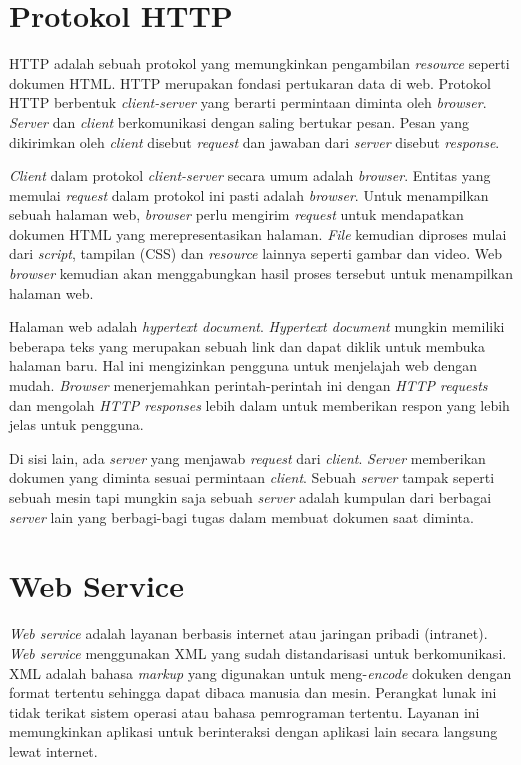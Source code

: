 \section{Protokol HTTP}
\label{sec:httpprotocol}

HTTP adalah sebuah protokol yang memungkinkan pengambilan \textit{resource} seperti dokumen HTML. HTTP merupakan fondasi pertukaran data di web. Protokol HTTP berbentuk \textit{client-server} yang berarti permintaan diminta oleh \textit{browser}. \textit{Server} dan \textit{client} berkomunikasi dengan saling bertukar pesan. Pesan yang dikirimkan oleh \textit{client} disebut \textit{request} dan jawaban dari \textit{server} disebut \textit{response}.

\textit{Client} dalam protokol \textit{client-server} secara umum adalah \textit{browser}. Entitas yang memulai \textit{request} dalam protokol ini pasti adalah \textit{browser}. Untuk menampilkan sebuah halaman web, \textit{browser} perlu mengirim \textit{request} untuk mendapatkan dokumen HTML yang merepresentasikan halaman. \textit{File} kemudian diproses mulai dari \textit{script}, tampilan (CSS) dan \textit{resource} lainnya seperti gambar dan video. Web \textit{browser} kemudian akan menggabungkan hasil proses tersebut untuk menampilkan halaman web.

Halaman web adalah \textit{hypertext document}. \textit{Hypertext document} mungkin memiliki beberapa teks yang merupakan sebuah link dan dapat diklik untuk membuka halaman baru. Hal ini mengizinkan pengguna untuk menjelajah web dengan mudah. \textit{Browser} menerjemahkan perintah-perintah ini dengan \textit{HTTP requests} dan mengolah \textit{HTTP responses} lebih dalam untuk memberikan respon yang lebih jelas untuk pengguna.

Di sisi lain, ada \textit{server} yang menjawab \textit{request} dari \textit{client}. \textit{Server} memberikan dokumen yang diminta sesuai permintaan \textit{client}. Sebuah \textit{server} tampak seperti sebuah mesin tapi mungkin saja sebuah \textit{server} adalah kumpulan dari berbagai \textit{server} lain yang berbagi-bagi tugas dalam membuat dokumen saat diminta. ~\cite{mozilla:19:http}

\section{Web Service}
\label{sec:webservice}

\textit{Web service} adalah layanan berbasis internet atau jaringan pribadi (intranet). \textit{Web service} menggunakan XML yang sudah distandarisasi untuk berkomunikasi. XML adalah bahasa \textit{markup} yang digunakan untuk meng-\textit{encode} dokuken dengan format tertentu sehingga dapat dibaca manusia dan mesin. Perangkat lunak ini tidak terikat sistem operasi atau bahasa pemrograman tertentu. Layanan ini memungkinkan aplikasi untuk berinteraksi dengan aplikasi lain secara langsung lewat internet.

